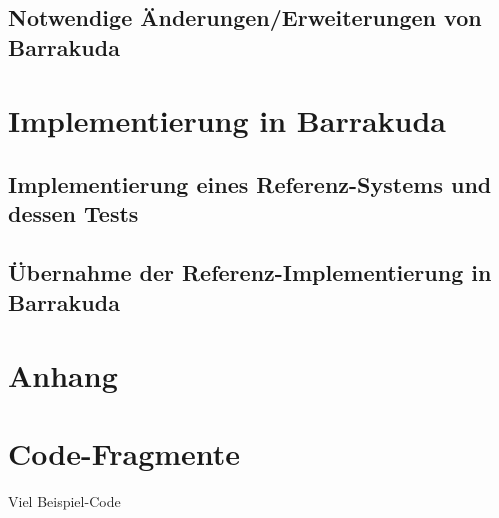 \documentclass[12pt,a4paper,bibliography=totocnumbered,listof=totocnumbered]{scrartcl}
\begin{document}
\subsection{Notwendige Änderungen/Erweiterungen von Barrakuda}

\section{Implementierung in Barrakuda}

\subsection{Implementierung eines Referenz-Systems und dessen Tests}

\subsection{Übernahme der Referenz-Implementierung in Barrakuda}

\renewcommand\refname{Quellenverzeichnis}


\pagebreak

\setcounter{page}{1}

\begin{appendix}
\section*{Anhang}
{}

\section{Code-Fragmente}
Viel Beispiel-Code

\end{appendix}
\end{document}
